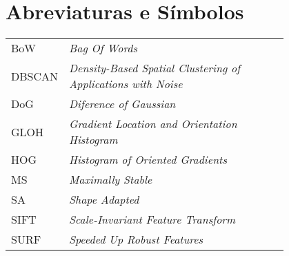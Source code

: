 \chapter*{Abreviaturas e Símbolos}

\begin{flushleft}
\begin{tabular}{l p{0.8\linewidth}}
BoW		 & \textit{Bag Of Words}\\
DBSCAN   & \textit{Density-Based Spatial Clustering of Applications with Noise}\\
DoG      & \textit{Diference of Gaussian}\\
GLOH     & \textit{Gradient Location and Orientation Histogram}\\
HOG      & \textit{Histogram of Oriented Gradients}\\
MS		 & \textit{Maximally Stable}\\
SA		 & \textit{Shape Adapted}\\
SIFT     & \textit{Scale-Invariant Feature Transform}\\
SURF     & \textit{Speeded Up Robust Features}



\end{tabular}
\end{flushleft}

